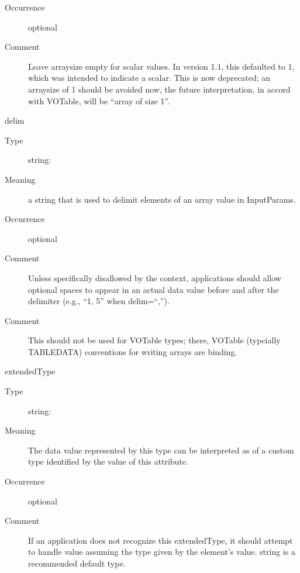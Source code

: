 \documentclass[11pt,a4paper]{ivoa}
\begin{document}
\begin{generated}
\begin{bigdescription}
\begin{description}
\item[Occurrence] optional

\item[Comment] 
                     Leave arraysize empty for scalar values.  In version 1.1,
                     this defaulted to 1, which was intended to indicate
                     a scalar.  This is now deprecated; an arraysize of 1 should
                     be avoided now, the future interpretation, in accord with
                     VOTable, will be “array of size 1”.
                  
\end{description}
\item[delim]
\begin{description}
\item[Type] string: 
\item[Meaning] 
                     a string that is used to delimit elements of an array
                     value in InputParams.
                  
\item[Occurrence] optional
\item[Comment] 
                     Unless specifically disallowed by the context, 
                     applications should allow optional spaces to 
                     appear in an actual data value before and after 
                     the delimiter (e.g., “1, 5” when delim=“,”).
                  
\item[Comment] 
                     This should not be used for VOTable types; there,
                     VOTable (typcially TABLEDATA) conventions for writing
                     arrays are binding.
                  
\end{description}
\item[extendedType]
\begin{description}
\item[Type] string: 
\item[Meaning] 
                     The data value represented by this type can be
                     interpreted as of a custom type identified by 
                     the value of this attribute.
                  
\item[Occurrence] optional
\item[Comment] 
                     If an application does not recognize this
                     extendedType, it should attempt to handle value
                     assuming the type given by the element's value.
                     string is a recommended default type.
                  

\end{description}
\end{bigdescription}
\end{generated}
\end{document}

